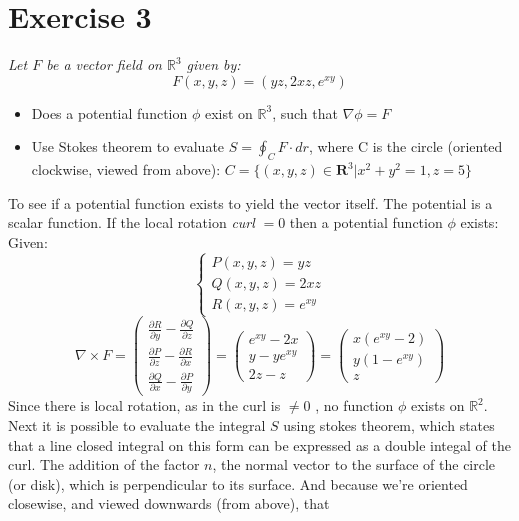 \section{Exercise 3}
\textit{Let $F$ be a vector field on $\mathbb{R}^3$ given by:}
\[F(x,y,z)  = (yz, 2xz, e^{xy})\]

\begin{itemize}
    \item Does a potential function $\phi$ exist on $\mathbb{R}^3$, such that $\nabla\phi = F$
    \item Use Stokes theorem to evaluate $S=\oint_C F \cdot dr$, where C is the circle (oriented clockwise, viewed from above): $C = \{(x,y,z) \in \mathbf{R}^3 | x^2 + y^2 = 1, z=5\}$
\end{itemize}

To see if a potential function exists to yield the vector itself. The
potential is a scalar function. If the local rotation \textit{curl} $=0$ then
a potential function $\phi$ exists:
Given:
\[\begin{cases}
    P(x,y,z) = yz\\
    Q(x,y,z) = 2xz\\
    R(x,y,z) = e^{xy}
\end{cases}\]
\[\nabla \times F = 
\begin{pmatrix}
\frac{\partial R}{\partial y} - \frac{\partial Q}{\partial z}\\
\frac{\partial P}{\partial z} - \frac{\partial R}{\partial x}\\
\frac{\partial Q}{\partial x} - \frac{\partial P}{\partial y}
\end{pmatrix} 
=
\begin{pmatrix}
e^{xy}-2x\\
y-ye^{xy}\\
2z-z
\end{pmatrix} 
=
\begin{pmatrix}
x(e^{xy}-2)\\
y(1-e^{xy})\\
z
\end{pmatrix}
\]
Since there is local rotation, as in the curl is $\neq0$ , no function $\phi$
exists on $\mathbb{R}^2$.\\
Next it is possible to evaluate the integral $S$ using stokes theorem,
which states that a line closed integral on this form can be expressed as a 
double integal of the curl. The addition of the factor $n$, the normal
vector to the surface of the circle (or disk), which is perpendicular to its 
surface. And because we're oriented closewise, and viewed downwards (from above), that
